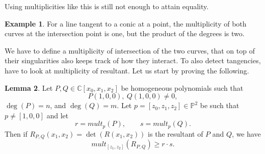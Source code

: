 \documentclass{article}
\newcommand{\C}{\mathbb{C}}
\renewcommand{\P}{\mathbb{P}}
\newcommand{\rb}[1]{\left( #1 \right)}
\renewcommand{\sb}[1]{\left[ #1 \right]}
\theoremstyle{definition}\newtheorem{definition}{Definition}[section]
\theoremstyle{definition}\newtheorem{notation}[definition]{Notation}
\theoremstyle{definition}\newtheorem{remark}[definition]{Remark}
\theoremstyle{definition}\newtheorem{example}[definition]{Example}
\theoremstyle{definition}\newtheorem{fact}{Fact}
\theoremstyle{definition}\newtheorem{exercise}{Exercise}
\newtheorem{lemma}[definition]{Lemma}
\begin{document}
Using multiplicities like this is still not enough to attain equality.

\begin{example}
For a line tangent to a conic at a point, the multiplicity of both curves at the intersection point is one, but the product of the degrees is two.
\end{example}

We have to define a multiplicity of intersection of the two curves, that on top of their singularities also keeps track of how they interact. To also detect tangencies, have to look at multiplicity of resultant. Let us start by proving the following.

\begin{lemma}
\label{lem:11.7}
Let $ P, Q \in \C\sb{x_0, x_1, x_2} $ be homogeneous polynomials such that
$$ P\rb{1, 0, 0}, \ Q\rb{1, 0, 0} \ne 0, $$
$ \deg\rb{P} = n $, and $ \deg\rb{Q} = m $. Let $ p = \sb{z_0, z_1, z_2} \in \P^2 $ be such that $ p \ne \sb{1, 0, 0} $ and let
$$ r = mult_p\rb{P}, \qquad s = mult_p\rb{Q}. $$
Then if $ R_{P, Q}\rb{x_1, x_2} = \det\rb{R\rb{x_1, x_2}} $ is the resultant of $ P $ and $ Q $, we have
$$ mult_{\sb{z_1, z_2}}\rb{R_{P, Q}} \ge r \cdot s. $$
\end{lemma}
\end{document}
